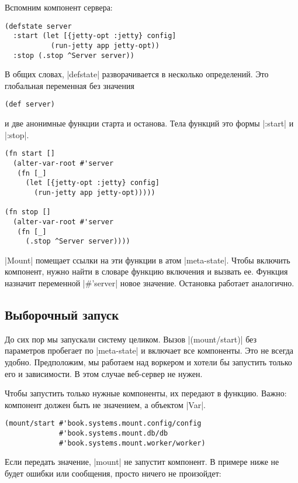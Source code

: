 
Вспомним компонент сервера:

\begin{verbatim}
(defstate server
  :start (let [{jetty-opt :jetty} config]
           (run-jetty app jetty-opt))
  :stop (.stop ^Server server))
\end{verbatim}

В общих словах, \spverb|defstate| разворачивается в несколько определений. Это
глобальная переменная без значения

\begin{verbatim}
(def server)
\end{verbatim}

\noindent
и две анонимные функции старта и останова. Тела функций это формы
\spverb|:start| и \spverb|:stop|.

\begin{verbatim}
(fn start []
  (alter-var-root #'server
   (fn [_]
     (let [{jetty-opt :jetty} config]
       (run-jetty app jetty-opt)))))

(fn stop []
  (alter-var-root #'server
   (fn [_]
     (.stop ^Server server))))
\end{verbatim}

\spverb|Mount| помещает ссылки на эти функции в атом \spverb|meta-state|. Чтобы
включить компонент, нужно найти в словаре функцию включения и вызвать
ее. Функция назначит переменной \spverb|#'server| новое значение. Остановка
работает аналогично.

\subsection{Выборочный запуск}

До сих пор мы запускали систему целиком. Вызов \spverb|(mount/start)| без
параметров пробегает по \spverb|meta-state| и включает все компоненты. Это не
всегда удобно. Предположим, мы работаем над воркером и хотели бы запустить
только его и зависимости. В этом случае веб-сервер не нужен.

Чтобы запустить только нужные компоненты, их передают в функцию. Важно:
компонент должен быть не значением, а объектом \spverb|Var|.

\begin{verbatim}
(mount/start #'book.systems.mount.config/config
             #'book.systems.mount.db/db
             #'book.systems.mount.worker/worker)
\end{verbatim}

Если передать значение, \spverb|mount| не запустит компонент. В примере ниже не
будет ошибки или сообщения, просто ничего не произойдет:

